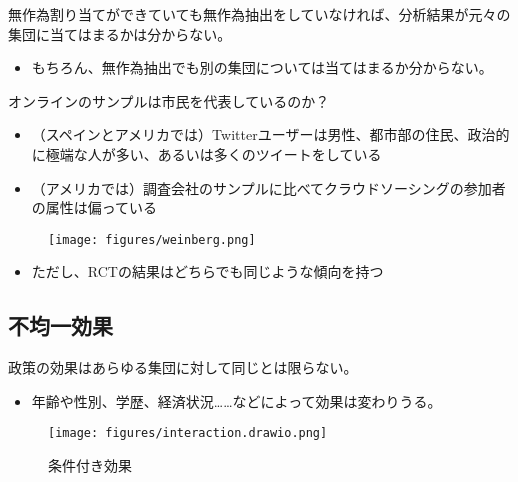 \documentclass[
  xelatex,
  ja=standard]{bxjsarticle}
\providecommand{\tightlist}{%
  \setlength{\itemsep}{0pt}\setlength{\parskip}{0pt}}\usepackage{longtable,booktabs,array}
\begin{document}
無作為割り当てができていても無作為抽出をしていなければ、分析結果が元々の集団に当てはまるかは分からない。

\begin{itemize}
\tightlist
\item
  もちろん、無作為抽出でも別の集団については当てはまるか分からない。
\end{itemize}

オンラインのサンプルは市民を代表しているのか？

\begin{itemize}
\tightlist
\item
  （スペインとアメリカでは）Twitterユーザーは男性、都市部の住民、政治的に極端な人が多い、あるいは多くのツイートをしている\citep{barbera2015b}
\item
  （アメリカでは）調査会社のサンプルに比べてクラウドソーシングの参加者の属性は偏っている\citep{weinberg2014}
\end{itemize}

\begin{figure}[htpb]

{\centering \texttt{[image: figures/weinberg.png]}

}

\caption{\citet{weinberg2014}}

\end{figure}

\begin{itemize}
\tightlist
\item
  ただし、RCTの結果はどちらでも同じような傾向を持つ\citep{weinberg2014}
\end{itemize}

\hypertarget{ux4e0dux5747ux4e00ux52b9ux679c}{%
\subsection{不均一効果}\label{ux4e0dux5747ux4e00ux52b9ux679c}}

政策の効果はあらゆる集団に対して同じとは限らない。

\begin{itemize}
\tightlist
\item
  年齢や性別、学歴、経済状況\ldots\ldots などによって効果は変わりうる。
\end{itemize}

\begin{figure}[htpb]

{\centering \texttt{[image: figures/interaction.drawio.png]}

}

\caption{条件付き効果}

\end{figure}
\end{document}
